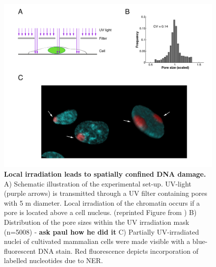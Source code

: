 \begin{figure}[htbp]
	\begin{center}
		\includegraphics[width=1\textwidth]{Abbildungen/figure2_1.pdf}
		\caption{\textbf{Local irradiation leads to spatially confined DNA damage.} A) Schematic illustration of the experimental set-up. UV-light (purple arrows) is transmitted through a UV filter containing pores with 5 \textmu m diameter. Local irradiation of the chromatin occurs if a pore is located above a cell nucleus. (reprinted Figure from \cite{Terstiege2010}) B) Distribution of the pore sizes within the UV irradiation mask (n=5008) - \textbf{ask paul how he did it} C) Partially UV-irradiated nuclei of cultivated mammalian cells were made visible with a blue-fluorescent DNA stain. Red fluorescence depicts incorporation of labelled nucleotides due to NER.}
		\label{fig:accuMethod}
	\end{center}
\end{figure}

